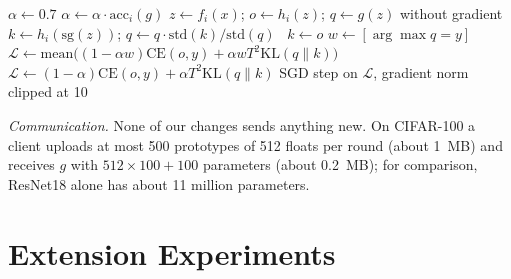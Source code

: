 \documentclass[conference]{IEEEtran}
\begin{document}
\begin{algorithm}[t]
\caption{Client distillation step in all four versions}
\label{alg:update}
\footnotesize
\begin{algorithmic}[1]
\State $\alpha \gets 0.7$ 
 $\alpha \gets \alpha \cdot \mathrm{acc}_i(g)$ 
\EndIf
{}
  \State $z \gets f_i(x)$; $o \gets h_i(z)$; $q \gets g(z)$ without gradient
   
    \State $k \gets h_i(\mathrm{sg}(z))$; $q \gets q\cdot\mathrm{std}(k)/\mathrm{std}(q)$
  \Else\ $k \gets o$ 
  \EndIf
   
    \State $w \gets [\arg\max q = y]$
    \State $\mathcal{L} \gets \mathrm{mean}\big((1-\alpha w)\mathrm{CE}(o,y) + \alpha w T^2\mathrm{KL}(q\|k)\big)$
  \Else\ $\mathcal{L} \gets (1-\alpha)\mathrm{CE}(o,y) + \alpha T^2\mathrm{KL}(q\|k)$
  \EndIf
  \State SGD step on $\mathcal{L}$, gradient norm clipped at 10
\EndFor
\end{algorithmic}
\end{algorithm}

\textit{Communication.} None of our changes sends anything new. On CIFAR-100 a client uploads at most 500 prototypes of 512 floats per round (about 1~MB) and receives $g$ with $512\times100+100$ parameters (about 0.2~MB); for comparison, ResNet18 alone has about 11 million parameters.

\section{Extension Experiments}
\label{sec:ext}
\end{document}
